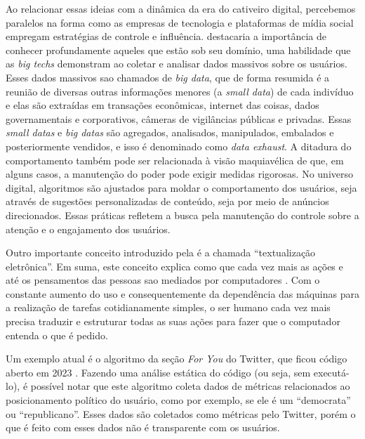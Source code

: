 \documentclass[
	12pt,
	openright,
	twoside,
	a4paper,
	english,
	french,
	spanish,
	brazil
]{abntex2}
\begin{document}
  Ao relacionar essas ideias com a dinâmica da era do cativeiro digital,
  percebemos paralelos na forma como as empresas de tecnologia e plataformas de
  mídia social empregam estratégias de controle e influência.
   destacaria a importância de conhecer
  profundamente aqueles que estão sob seu domínio, uma habilidade que as
  \textit{big techs} demonstram ao coletar e analisar dados massivos sobre os
  usuários. Esses dados massivos sao chamados de \textit{big data}, que de forma
  resumida é a reunião de diversas outras informações menores (a
  \textit{small data}) de cada indivíduo e elas são extraídas em transações
  econômicas, internet das coisas, dados governamentais e corporativos, câmeras
  de vigilâncias públicas e privadas. Essas \textit{small datas} e
  \textit{big datas} são agregados, analisados, manipulados, embalados e
  posteriormente vendidos, e isso é denominado como \textit{data exhaust}. A
  ditadura do comportamento também pode ser relacionada à visão maquiavélica de
  que, em alguns casos, a manutenção do poder pode exigir medidas rigorosas. No
  universo digital, algoritmos são ajustados para moldar o comportamento dos
  usuários, seja através de sugestões personalizadas de conteúdo, seja por meio
  de anúncios direcionados. Essas práticas refletem a busca pela manutenção do
  controle sobre a atenção e o engajamento dos usuários.

  Outro importante conceito introduzido pela
   é a chamada ``textualização
  eletrônica''. Em suma, este conceito explica como que cada vez mais as ações e
  até os pensamentos das pessoas sao mediados por computadores
  \cite{zuboff-capitalismo-vigilancia}. Com o constante aumento do uso e
  consequentemente da dependência das máquinas para a realização de tarefas
  cotidianamente simples, o ser humano cada vez mais precisa traduzir e
  estruturar todas as suas ações para fazer que o computador entenda o que é
  pedido.

  \newpage

  Um exemplo atual é o algoritmo da seção \textit{For You} do Twitter, que ficou
  código aberto em 2023 \cite{github-for-you}. Fazendo uma análise estática do
  código (ou seja, sem executá-lo), é possível notar que este algoritmo coleta
  dados de métricas relacionados ao posicionamento político do usuário, como por
  exemplo, se ele é um ``democrata'' ou ``republicano''. Esses dados são
  coletados como métricas pelo Twitter, porém o que é feito com esses dados não
  é transparente com os usuários.
\end{document}
